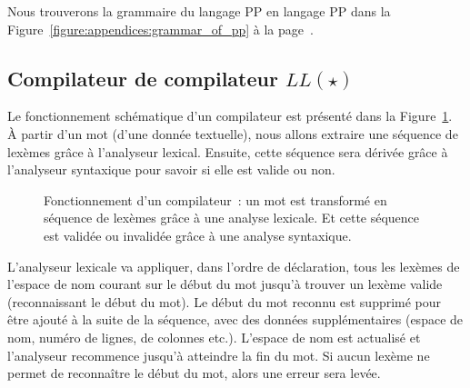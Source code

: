 Nous trouverons la grammaire du langage PP en langage PP dans la
Figure~\ref{figure:appendices:grammar_of_pp} à la
page~\pageref{figure:appendices:grammar_of_pp}.

\subsection{Compilateur de compilateur $LL(\star)$}
\label{subsection:data:compiler-compiler}

Le fonctionnement schématique d'un compilateur est présenté dans la
Figure~\ref{figure:data:compiler}. À partir d'un {\strong mot} (d'une donnée
textuelle), nous allons extraire une {\strong séquence} de lexèmes grâce à
l'analyseur lexical. Ensuite, cette séquence sera {\strong dérivée} grâce à
l'analyseur syntaxique pour savoir si elle est valide ou non.
%
\begin{figure}


\caption{\label{figure:data:compiler} Fonctionnement d'un compilateur~: un mot
est transformé en séquence de lexèmes grâce à une analyse lexicale. Et cette
séquence est validée ou invalidée grâce à une analyse syntaxique.}

\end{figure}
%
L'analyseur lexicale va appliquer, dans l'ordre de déclaration, tous les lexèmes
de l'espace de nom courant sur le début du mot jusqu'à trouver un lexème valide
(reconnaissant le début du mot). Le début du mot reconnu est supprimé pour être
ajouté à la suite de la séquence, avec des données supplémentaires (espace de
nom, numéro de lignes, de colonnes etc.). L'espace de nom est actualisé et
l'analyseur recommence jusqu'à atteindre la fin du mot. Si aucun lexème ne
permet de reconnaître le début du mot, alors une erreur sera levée.

